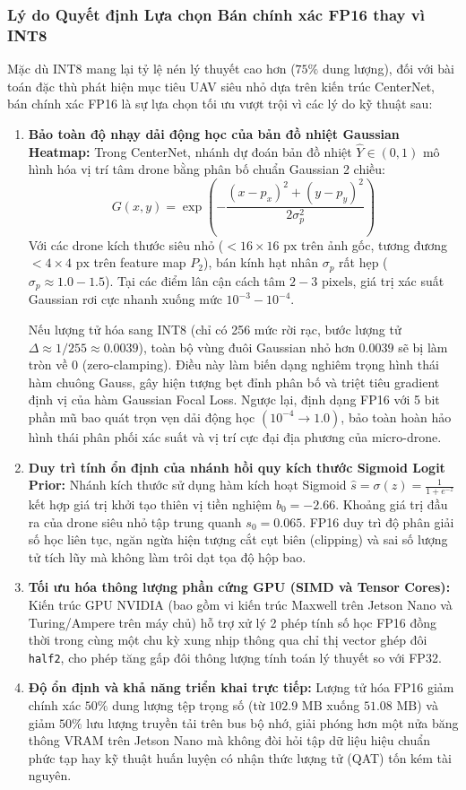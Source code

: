 \documentclass[11pt,a4paper]{article}
\begin{document}
\subsubsection{Lý do Quyết định Lựa chọn Bán chính xác FP16 thay vì INT8}
Mặc dù INT8 mang lại tỷ lệ nén lý thuyết cao hơn ($75\%$ dung lượng), đối với bài toán đặc thù phát hiện mục tiêu UAV siêu nhỏ dựa trên kiến trúc CenterNet, bán chính xác FP16 là sự lựa chọn tối ưu vượt trội vì các lý do kỹ thuật sau:
\begin{enumerate}
    \item \textbf{Bảo toàn độ nhạy dải động học của bản đồ nhiệt Gaussian Heatmap:}
    Trong CenterNet, nhánh dự đoán bản đồ nhiệt $\hat{Y} \in (0, 1)$ mô hình hóa vị trí tâm drone bằng phân bố chuẩn Gaussian 2 chiều:
    \begin{equation}
    G(x, y) = \exp\left(-\frac{(x - p_x)^2 + (y - p_y)^2}{2\sigma_p^2}\right)
    \end{equation}
    Với các drone kích thước siêu nhỏ ($< 16 \times 16\text{ px}$ trên ảnh gốc, tương đương $< 4 \times 4\text{ px}$ trên feature map $P_2$), bán kính hạt nhân $\sigma_p$ rất hẹp ($\sigma_p \approx 1.0 - 1.5$). Tại các điểm lân cận cách tâm $2 - 3\text{ pixels}$, giá trị xác suất Gaussian rơi cực nhanh xuống mức $10^{-3} - 10^{-4}$.
    
    Nếu lượng tử hóa sang INT8 (chỉ có 256 mức rời rạc, bước lượng tử $\Delta \approx 1/255 \approx 0.0039$), toàn bộ vùng đuôi Gaussian nhỏ hơn $0.0039$ sẽ bị làm tròn về $0$ (zero-clamping). Điều này làm biến dạng nghiêm trọng hình thái hàm chuông Gauss, gây hiện tượng bẹt đỉnh phân bố và triệt tiêu gradient định vị của hàm Gaussian Focal Loss. Ngược lại, định dạng FP16 với 5 bit phần mũ bao quát trọn vẹn dải động học $(10^{-4} \to 1.0)$, bảo toàn hoàn hảo hình thái phân phối xác suất và vị trí cực đại địa phương của micro-drone.
    \item \textbf{Duy trì tính ổn định của nhánh hồi quy kích thước Sigmoid Logit Prior:}
    Nhánh kích thước sử dụng hàm kích hoạt Sigmoid $\hat{s} = \sigma(z) = \frac{1}{1 + e^{-z}}$ kết hợp giá trị khởi tạo thiên vị tiền nghiệm $b_0 = -2.66$. Khoảng giá trị đầu ra của drone siêu nhỏ tập trung quanh $s_0 = 0.065$. FP16 duy trì độ phân giải số học liên tục, ngăn ngừa hiện tượng cắt cụt biên (clipping) và sai số lượng tử tích lũy mà không làm trôi dạt tọa độ hộp bao.
    \item \textbf{Tối ưu hóa thông lượng phần cứng GPU (SIMD và Tensor Cores):}
    Kiến trúc GPU NVIDIA (bao gồm vi kiến trúc Maxwell trên Jetson Nano và Turing/Ampere trên máy chủ) hỗ trợ xử lý 2 phép tính số học FP16 đồng thời trong cùng một chu kỳ xung nhịp thông qua chỉ thị vector ghép đôi \texttt{half2}, cho phép tăng gấp đôi thông lượng tính toán lý thuyết so với FP32.
    \item \textbf{Độ ổn định và khả năng triển khai trực tiếp:}
    Lượng tử hóa FP16 giảm chính xác $50\%$ dung lượng tệp trọng số (từ $102.9\text{ MB}$ xuống $51.08\text{ MB}$) và giảm $50\%$ lưu lượng truyền tải trên bus bộ nhớ, giải phóng hơn một nửa băng thông VRAM trên Jetson Nano mà không đòi hỏi tập dữ liệu hiệu chuẩn phức tạp hay kỹ thuật huấn luyện có nhận thức lượng tử (QAT) tốn kém tài nguyên.
\end{enumerate}
\end{document}
